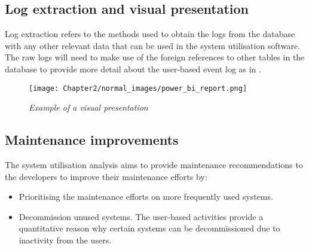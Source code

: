 \subsection{Log extraction and visual presentation}\label{sec:ch2_logExtraction}
Log extraction refers to the methods used to obtain the logs from the database with any other relevant data that can be used in the system utilisation software. The raw logs will need to make use of the foreign references to other tables in the database to provide more detail about the user-based event log as in .\par

\begin{figure}[!htb] %
	\centering %
	\texttt{[image: Chapter2/normal\_images/power\_bi\_report.png]}
	\caption[Example of a visual presentation]
	{\textit{Example of a visual presentation}}\label{fig:ch2_pbiExample}
\end{figure}

\subsection{Maintenance improvements}\label{sec:ch2_utilisationImprovements}
The system utilisation analysis aims to provide maintenance recommendations to the developers to improve their maintenance efforts by:

\begin{itemize}
	\item Prioritising the maintenance efforts on more frequently used systems.
	\item Decommission unused systems. The user-based activities provide a quantitative reason why certain systems can be decommissioned due to inactivity from the users.
\end{itemize}

